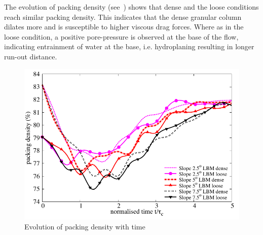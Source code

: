 The evolution of packing density (see~) shows that dense and the 
loose conditions reach similar packing density. This indicates that the dense 
granular column dilates more and is susceptible to higher viscous drag forces. 
Where as in the loose condition, a positive pore-pressure is observed at the 
base of the flow, indicating entrainment of water at the base, i.e. 
hydroplaning resulting in longer run-out distance.

\begin{figure}
\centering
\includegraphics[width=0.97\columnwidth]{Voronoi_Slope_Dense_Loose}
\caption{Evolution of packing density with time}
\label{fig:voro}
\end{figure}

